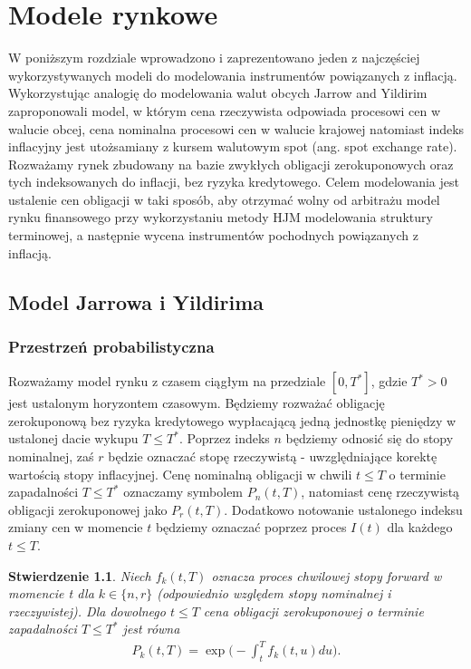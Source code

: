 \documentclass{mini}
\theoremstyle{mythstyle}
\newtheorem{Stwierdzenie}{Stwierdzenie}[chapter]
\begin{document}
\chapter{Modele rynkowe}

	W poniższym rozdziale wprowadzono i zaprezentowano jeden z najczęściej wykorzystywanych modeli do modelowania instrumentów powiązanych z inflacją. Wykorzystując analogię do modelowania walut obcych Jarrow and Yildirim zaproponowali model, w którym cena rzeczywista odpowiada procesowi cen w walucie obcej, cena nominalna procesowi cen w walucie krajowej natomiast indeks inflacyjny jest utożsamiany z kursem walutowym spot (ang. spot exchange rate). Rozważamy rynek zbudowany na bazie zwykłych obligacji zerokuponowych oraz tych indeksowanych do inflacji, bez ryzyka kredytowego. Celem modelowania jest ustalenie cen obligacji w taki sposób, aby otrzymać wolny od arbitrażu model rynku finansowego przy wykorzystaniu metody HJM modelowania struktury terminowej, a następnie wycena instrumentów pochodnych powiązanych z inflacją.
	
	\section{Model Jarrowa i Yildirima}
	
	\subsection*{Przestrzeń probabilistyczna}
		
	Rozważamy model rynku z czasem ciągłym na przedziale $[0,T^*]$, gdzie $T^* > 0$ jest ustalonym horyzontem czasowym. Będziemy rozważać obligację zerokuponową bez ryzyka kredytowego wypłacającą jedną jednostkę pieniędzy w ustalonej dacie wykupu $T \le T^*$. Poprzez indeks $n$ będziemy odnosić się do stopy nominalnej, zaś $r$ będzie oznaczać stopę rzeczywistą  - uwzględniające korektę wartością stopy inflacyjnej. Cenę nominalną obligacji w chwili $t \le T$ o terminie zapadalności $T \le T^*$  oznaczamy symbolem $P_n (t,T)$, natomiast cenę rzeczywistą obligacji zerokuponowej jako $P_r (t,T)$. Dodatkowo notowanie ustalonego indeksu zmiany cen w momencie $t$ będziemy oznaczać poprzez proces $I(t)$ dla każdego $t \le T$.\\
	\begin{Stwierdzenie}
		Niech $f_k(t,T)$ oznacza proces chwilowej stopy forward w momencie t dla $k \in \{n,r\}$ (odpowiednio względem stopy nominalnej i rzeczywistej). Dla dowolnego  $t \le T$ cena obligacji zerokuponowej o terminie zapadalności $T \le T^*$ jest równa
		\begin{eqnarray*}
			P_k(t,T) = \exp \bigg(-\int_t^T f_k(t,u) du \bigg).
		\end{eqnarray*}
	\end{Stwierdzenie}
	
\end{document}
